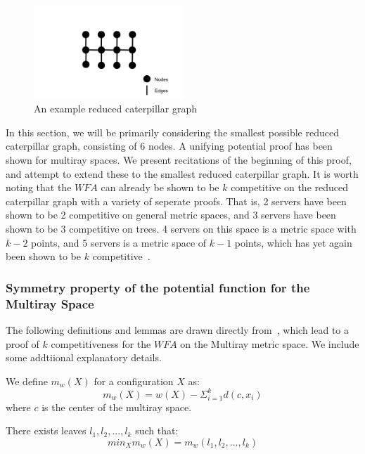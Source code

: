 \begin{figure}[H]
    \centering
    \includegraphics[width=0.5\textwidth]{images/reducedCaterpillar.png}
    \caption{An example reduced caterpillar graph}
\end{figure}

In this section, we will be primarily considering the smallest possible reduced caterpillar graph, consisting of 6 nodes. A unifying potential proof has been shown for multiray spaces. We present recitations of the beginning of this proof, and attempt to extend these to the smallest reduced caterpillar graph. It is worth noting that the $WFA$ can already be shown to be $k$ competitive on the reduced caterpillar graph with a variety of seperate proofs. That is, 2 servers have been shown to be 2 competitive on general metric spaces, and 3 servers have been shown to be 3 competitive on trees. 4 servers on this space is a metric space with $k-2$ points, and 5 servers is a metric space of $k-1$ points, which has yet again been shown to be $k$ competitive~\cite{unifyingPotential2021}.

\subsubsection*{Symmetry property of the potential function for the Multiray Space}

The following definitions and lemmas are drawn directly from~\cite{unifyingPotential2021}, which lead to a proof of $k$ competitiveness for the $WFA$ on the Multiray metric space. We include some addtiional explanatory details.

\begin{definition}
    \label{def:mw}
    We define $m_w(X)$ for a configuration $X$ as:
    \begin{equation*}
        m_w(X) = w(X) - \Sigma_{i=1} ^ k d(c, x_i)
    \end{equation*}
    where $c$ is the center of the multiray space.
\end{definition}

\begin{lemma}
    \label{lem:leaf2}
    There exists leaves $l_1, l_2, ..., l_k$ such that: 
    \begin{equation*}
        min_X m_w(X) = m_w (l_1, l_2, ..., l_k)
    \end{equation*}
\end{lemma}

